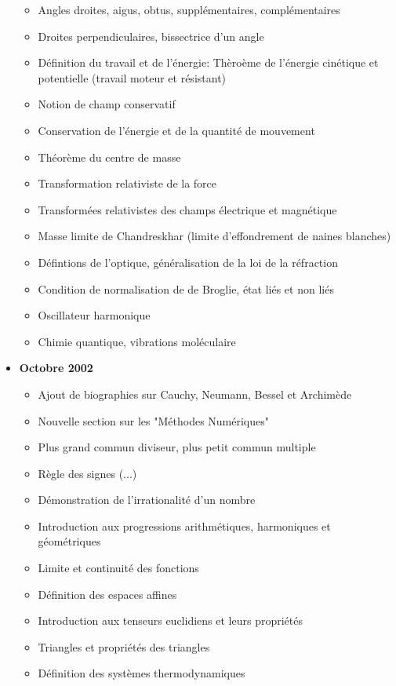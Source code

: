\begin{itemize}
\begin{itemize}[noitemsep]
				\item Angles droites, aigus, obtus, supplémentaires, complémentaires
				\item Droites perpendiculaires, bissectrice d'un angle
				\item Définition du travail et de l'énergie: Thèroème de l'énergie cinétique et potentielle (travail moteur et résistant)
				\item Notion de champ conservatif
				\item Conservation de l'énergie et de la quantité de mouvement
				\item Théorème du centre de masse
				\item Transformation relativiste de la force
				\item Transformées relativistes des champs électrique et magnétique
				\item Masse limite de Chandreskhar (limite d'effondrement de naines blanches)
				\item Défintions de l'optique, généralisation de la loi de la réfraction
				\item Condition de normalisation de de Broglie, état liés et non liés
				\item Oscillateur harmonique
				\item Chimie quantique, vibrations moléculaire
			\end{itemize}
		\item \textbf{Octobre 2002}
			\begin{itemize}[noitemsep]
				\item Ajout de biographies sur Cauchy, Neumann, Bessel et Archimède
				\item Nouvelle section sur les "Méthodes Numériques"
				\item Plus grand commun diviseur, plus petit commun multiple
				\item Règle des signes (...)
				\item Démonstration de l'irrationalité d'un nombre
				\item Introduction aux progressions arithmétiques, harmoniques et géométriques
				\item Limite et continuité des fonctions
				\item Définition des espaces affines
				\item Introduction aux tenseurs euclidiens et leurs propriétés
				\item Triangles et propriétés des triangles
				\item Définition des systèmes thermodynamiques

\end{itemize}
\end{itemize}
